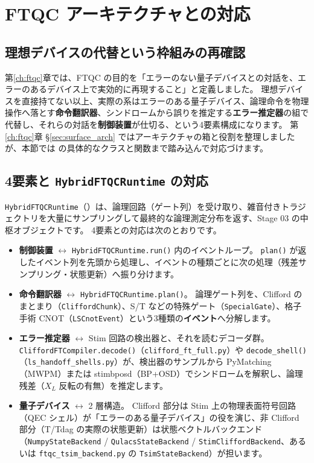 \section{FTQC アーキテクチャとの対応}\label{sec:ftqc_arch}

\subsection{理想デバイスの代替という枠組みの再確認}

第\ref{ch:ftqc}章では、FTQC の目的を「エラーのない量子デバイスとの対話を、エラーのあるデバイス上で実効的に再現すること」と定義しました。
理想デバイスを直接持てない以上、実際の系はエラーのある量子デバイス、論理命令を物理操作へ落とす\textbf{命令翻訳器}、シンドロームから誤りを推定する\textbf{エラー推定器}の組で代替し、それらの対話を\textbf{制御装置}が仕切る、という4要素構成になります。
第\ref{ch:ftqc}章 §\ref{sec:surface_arch} ではアーキテクチャの箱と役割を整理しましたが、本節では  の具体的なクラスと関数まで踏み込んで対応づけます。

\subsection{4要素と \texttt{HybridFTQCRuntime} の対応}

\lstinline{HybridFTQCRuntime}（）は、論理回路（ゲート列）を受け取り、雑音付きトラジェクトリを大量にサンプリングして最終的な論理測定分布を返す、Stage 03 の中枢オブジェクトです。
4要素との対応は次のとおりです。

\begin{itemize}
  \item \textbf{制御装置} $\leftrightarrow$ \lstinline{HybridFTQCRuntime.run()} 内のイベントループ。
    \lstinline{plan()} が返したイベント列を先頭から処理し、イベントの種類ごとに次の処理（残差サンプリング・状態更新）へ振り分けます。
  \item \textbf{命令翻訳器} $\leftrightarrow$ \lstinline{HybridFTQCRuntime.plan()}。
    論理ゲート列を、Clifford のまとまり（\lstinline{CliffordChunk}）、S/T などの特殊ゲート（\lstinline{SpecialGate}）、格子手術 CNOT（\lstinline{LSCnotEvent}）という3種類の\textbf{イベント}へ分解します。
  \item \textbf{エラー推定器} $\leftrightarrow$ Stim 回路の検出器と、それを読むデコーダ群。
    \lstinline{CliffordFTCompiler.decode()}（\texttt{clifford\_ft\_full.py}）や \lstinline{decode_shell()}（\texttt{ls\_handoff\_shells.py}）が、検出器のサンプルから PyMatching（MWPM）または stimbposd（BP+OSD）でシンドロームを解釈し、論理残差（$X_L$ 反転の有無）を推定します。
  \item \textbf{量子デバイス} $\leftrightarrow$ 2 層構造。
    Clifford 部分は Stim 上の物理表面符号回路（QEC シェル）が「エラーのある量子デバイス」の役を演じ、非 Clifford 部分（T/Tdag の実際の状態更新）は状態ベクトルバックエンド（\lstinline{NumpyStateBackend} / \lstinline{QulacsStateBackend} / \lstinline{StimCliffordBackend}、あるいは \texttt{ftqc\_tsim\_backend.py} の \lstinline{TsimStateBackend}）が担います。
\end{itemize}

